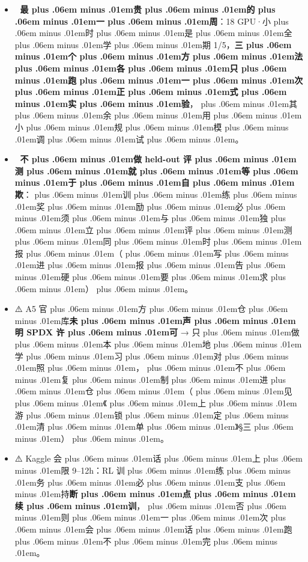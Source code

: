 \documentclass[
]{article}
\providecommand{\tightlist}{%
  \setlength{\itemsep}{0pt}\setlength{\parskip}{0pt}}
\def\zh#1{{\zhfont #1}}
\def\sym#1{{\symfont #1}}
\def\emo#1{{\emofont #1}}
\def\zhglue{\hskip0pt plus .06em minus .01em}
\begin{document}
\begin{itemize}
\tightlist
\item
  \emo{🚨} \textbf{\zh{最\zhglue 贵\zhglue 的\zhglue 一\zhglue 周}}\zh{：}18 GPU\sym{·}\zh{小\zhglue 时\zhglue 是\zhglue 全\zhglue 学\zhglue 期} 1/5\zh{，}\textbf{\zh{三\zhglue 个\zhglue 方\zhglue 法\zhglue 各\zhglue 只\zhglue 跑\zhglue 一\zhglue 次\zhglue 正\zhglue 式\zhglue 实\zhglue 验}}\zh{，\zhglue 其\zhglue 余\zhglue 用\zhglue 小\zhglue 规\zhglue 模\zhglue 调\zhglue 试\zhglue 。}
\item
  \emo{🚨} \textbf{\zh{不\zhglue 做} held-out \zh{评\zhglue 测\zhglue 就\zhglue 等\zhglue 于\zhglue 自\zhglue 欺}}\zh{：\zhglue 训\zhglue 练\zhglue 奖\zhglue 励\zhglue 必\zhglue 须\zhglue 与\zhglue 独\zhglue 立\zhglue 评\zhglue 测\zhglue 同\zhglue 时\zhglue 报\zhglue （\zhglue 写\zhglue 进\zhglue 报\zhglue 告\zhglue 硬\zhglue 要\zhglue 求\zhglue ）\zhglue 。}
\item
  \sym{⚠️} A5 \zh{官\zhglue 方\zhglue 仓\zhglue 库}\textbf{\zh{未\zhglue 声\zhglue 明} SPDX \zh{许\zhglue 可}} \sym{→} \zh{只\zhglue 做\zhglue 本\zhglue 地\zhglue 学\zhglue 习\zhglue 对\zhglue 照\zhglue ，\zhglue 不\zhglue 复\zhglue 制\zhglue 进\zhglue 仓\zhglue （\zhglue 见\zhglue 《\zhglue 上\zhglue 游\zhglue 锁\zhglue 定\zhglue 清\zhglue 单\zhglue 》}\sym{§}\zh{三\zhglue ）\zhglue 。}
\item
  \sym{⚠️} Kaggle \zh{会\zhglue 话\zhglue 上\zhglue 限} 9--12h\zh{：}RL \zh{训\zhglue 练\zhglue 务\zhglue 必\zhglue 支\zhglue 持}\textbf{\zh{断\zhglue 点\zhglue 续\zhglue 训}}\zh{，\zhglue 否\zhglue 则\zhglue 一\zhglue 次\zhglue 会\zhglue 话\zhglue 跑\zhglue 不\zhglue 完\zhglue 。}
\end{itemize}
\end{document}
